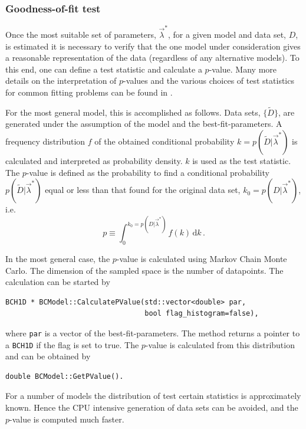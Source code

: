 \documentclass[11pt, a4paper]{article}
\begin{document}

\subsubsection{Goodness-of-fit test}

Once the most suitable set of parameters, $\vec{\lambda}^{*}$, for a
given model and data set, $D$, is estimated it is necessary
to verify that the one  model under consideration
gives a reasonable representation of the data
(regardless of any alternative models). To this end, one can
define a test statistic and calculate a $p$-value. Many more
details on the interpretation of $p$-values and the various
choices of test statistics for common fitting problems can be found
in \cite{BAT_pValue}.

For the most general model, this is accomplished as follows.
Data sets, $\{ \tilde{D} \}$, are generated under the
assumption of the model and the best-fit-parameters. A frequency
distribution $f$ of the obtained conditional probability
$k=p(\tilde{D}|\vec{\lambda}^{*})$ is calculated and interpreted as
probability density. $k$ is used as the test statistic.
The $p$-value is defined as the probability to
find a conditional probability $p(\tilde{D}|\vec{\lambda}^{*})$ equal
or less than that found for the original data set,
$k_{0}=p(D|\vec{\lambda}^{*})$, i.e.
%
\begin{equation}
p \equiv  \int_{0}^{k_{0}=p(D|\vec{\lambda}^{*})} f(k) \, \mathrm{d}k \, .
\end{equation}

In the most general case, the $p$-value is calculated using Markov
Chain Monte Carlo. The dimension of the sampled space is the number
of datapoints.
 The calculation can be started by
%
\begin{verbatim}
BCH1D * BCModel::CalculatePValue(std::vector<double> par,
                                 bool flag_histogram=false),
\end{verbatim}
%
where \verb|par| is a vector of the best-fit-parameters. The method
returns a pointer to a \verb|BCH1D| if the flag is set to true. The
$p$-value is calculated from this distribution and can be obtained by
%
\begin{verbatim}
double BCModel::GetPValue().
\end{verbatim}

For a number of models the distribution of test certain statistics is
approximately known. Hence the CPU intensive generation of data sets
can be avoided, and the $p$-value is computed much faster.
\end{document}
